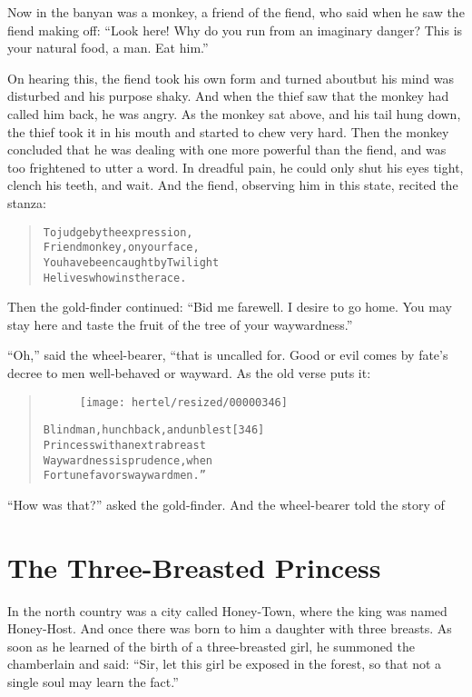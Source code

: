 \documentclass[article, twoside, 10pt]{memoir}
\renewenvironment{verbatim}{%
\begin{quote}%
\vskip -10pt%
\begin{alltt}\normalfont\small}{\end{alltt}%
\end{quote}%
\vskip -10pt
} %
\begin{document}
Now in the banyan was a monkey, a friend of the fiend, who said
when he saw the fiend making off:
``Look here! Why do you run from an imaginary danger? This is your natural food, a man. Eat him.''

On hearing this, the fiend took his own form and turned about{\textemdash}but
his mind was disturbed and his purpose shaky. And when the thief
saw that the monkey had called him back, he was angry. As the
monkey sat above, and his tail hung down, the thief took it in his
mouth and started to chew very hard. Then the monkey concluded that
he was dealing with one more powerful than the fiend, and was too
frightened to utter a word. In dreadful pain, he could only shut
his eyes tight, clench his teeth, and wait. And the fiend,
observing him in this state, recited the stanza:

\begin{verbatim}
To judge by the expression,
    Friend monkey, on your face,
You have been caught by Twilight{\textemdash}
    He lives who wins the race.
\end{verbatim}
Then the gold-finder continued:
``Bid me farewell. I desire to go home. You may stay here and taste the fruit of the tree of your waywardness.''

``Oh,'' said the wheel-bearer, “that is uncalled for. Good or evil
comes by fate's decree to men well-behaved or wayward. As the old
verse puts it:

\begin{verbatim}
\begin{figure}[p]\texttt{[image: hertel/resized/00000346]}\end{figure}Blind man, hunchback, and unblest                       [346]
Princess with an extra breast{\textemdash}
Waywardness is prudence, when
Fortune favors wayward men.”
\end{verbatim}
``How was that?'' asked the gold-finder. And the wheel-bearer told
the story of

\chapter{The Three-Breasted Princess}

In the north country was a city called Honey-Town, where the king
was named Honey-Host. And once there was born to him a daughter
with three breasts. As soon as he learned of the birth of a
three-breasted girl, he summoned the chamberlain and said:
``Sir, let this girl be exposed in the forest, so that not a single soul may learn the fact.''
\end{document}
